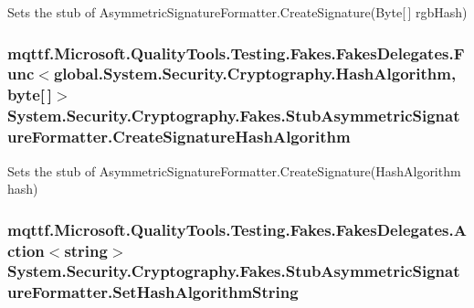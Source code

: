 Sets the stub of Asymmetric\-Signature\-Formatter.\-Create\-Signature(\-Byte\mbox{[}$\,$\mbox{]} rgb\-Hash)

\hypertarget{class_system_1_1_security_1_1_cryptography_1_1_fakes_1_1_stub_asymmetric_signature_formatter_adbd4efbac540ebbb4c994f772dd46c0f}{
\subsubsection[{Create\-Signature\-Hash\-Algorithm}]{\setlength{\rightskip}{0pt plus 5cm}mqttf.\-Microsoft.\-Quality\-Tools.\-Testing.\-Fakes.\-Fakes\-Delegates.\-Func$<$global.\-System.\-Security.\-Cryptography.\-Hash\-Algorithm, byte\mbox{[}$\,$\mbox{]}$>$ System.\-Security.\-Cryptography.\-Fakes.\-Stub\-Asymmetric\-Signature\-Formatter.\-Create\-Signature\-Hash\-Algorithm}}\label{class_system_1_1_security_1_1_cryptography_1_1_fakes_1_1_stub_asymmetric_signature_formatter_adbd4efbac540ebbb4c994f772dd46c0f}


Sets the stub of Asymmetric\-Signature\-Formatter.\-Create\-Signature(\-Hash\-Algorithm hash)

\hypertarget{class_system_1_1_security_1_1_cryptography_1_1_fakes_1_1_stub_asymmetric_signature_formatter_afbfe186c7d3733c51c5a0116abd2fb29}{
\subsubsection[{Set\-Hash\-Algorithm\-String}]{\setlength{\rightskip}{0pt plus 5cm}mqttf.\-Microsoft.\-Quality\-Tools.\-Testing.\-Fakes.\-Fakes\-Delegates.\-Action$<$string$>$ System.\-Security.\-Cryptography.\-Fakes.\-Stub\-Asymmetric\-Signature\-Formatter.\-Set\-Hash\-Algorithm\-String}}\label{class_system_1_1_security_1_1_cryptography_1_1_fakes_1_1_stub_asymmetric_signature_formatter_afbfe186c7d3733c51c5a0116abd2fb29}


